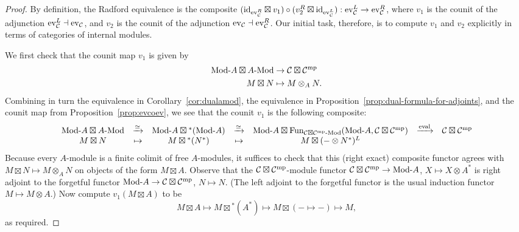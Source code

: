 \documentclass{amsart}
\begin{document}
\begin{proof}
By definition, the Radford equivalence is the composite $(\mathrm{id}_{\mathrm{ev}_\mathcal C^R} \boxtimes v_1) \circ (v_2^R \boxtimes \mathrm{id}_{\mathrm{ev}_\mathcal C^L}) : \mathrm{ev}_\mathcal C^L \rightarrow \mathrm{ev}_\mathcal C^R$, where $v_1$ is the counit of the adjunction $\mathrm{ev}_\mathcal C^L \dashv \mathrm{ev}_\mathcal C$, and $v_2$ is the counit of the adjunction $\mathrm{ev}_\mathcal C \dashv \mathrm{ev}_\mathcal C^R$.  Our initial task, therefore, is to compute $v_1$ and $v_2$ explicitly in terms of categories of internal modules.

We first check that the counit map $v_1$ is given by
\begin{align*}
\Mod{}{A} \boxtimes \Mod{A}{} &\ra \cC \boxtimes \cC^\mp \\
M \boxtimes N &\mapsto M \otimes_A N.
\end{align*}
Combining in turn the equivalence in Corollary~\ref{cor:dualamod}, the equivalence in Proposition~\ref{prop:dual-formula-for-adjoints}, and the counit map from Proposition~\ref{prop:evcoev}, we see that the counit $v_1$ is the following composite:
\[
\begin{array}{ccccccc}
\Mod{}{A} \boxtimes \Mod{A}{} 
&\xra{\simeq}& \Mod{}{A} \boxtimes {}^*(\Mod{}{A}) 
&\xra{\simeq}& \Mod{}{A} \boxtimes \Fun_{\Mod{\cC \boxtimes \cC^\mp}{}}(\Mod{}{A},\cC \boxtimes \cC^\mp) 
&\xra{\text{eval}}& \cC \boxtimes \cC^\mp 
\\
M \boxtimes N 
&\mapsto& M \boxtimes {}^*(N^*) 
&\mapsto& M \boxtimes (- \otimes N^*)^L
&& 
\end{array}
\] %
Because every $A$-module is a finite colimit of free $A$-modules, it suffices to check that this (right exact) composite functor agrees with $M \boxtimes N \mapsto M \otimes_A N$ on objects of the form $M \boxtimes A$.  Observe that the $\mathcal C \boxtimes \mathcal C^{\mathrm{mp}}$-module functor $\cC \boxtimes \cC^\mp \ra \Mod{}{A}$, $X \mapsto X \otimes A^*$ is right adjoint to the forgetful functor $\Mod{}{A} \ra \cC \boxtimes \cC^\mp$, $N \mapsto N$.  (The left adjoint to the forgetful functor is the usual induction functor $M \mapsto M \otimes A$.)  Now compute $v_1(M \boxtimes A)$ to be
\[
M \boxtimes A \mapsto M \boxtimes {}^*(A^*) \mapsto M \boxtimes (- \mapsto -) \mapsto M,
\]
as required.


\end{proof}
\end{document}
